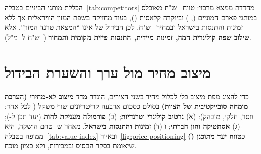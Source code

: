 הכללת מותגי הביניים בטבלה~\ref{tab:competitors} מחדדת ממצא מרכזי: טווח
~ש"ח מאוכלס במותגי פארם המוניים (, ) וביוקרה
קלאסית (), בעוד  מחזיקה בשפת המזון הוויראלית אך ללא
זמינות והתנסות בישראל ובמחיר ~ש"ח. לכן הבידול של  אינו
``המצאת טרנד המזון'', אלא \textbf{שילוב שפה קולינרית חמה, זמינות מיידית, התנסות
פיזית מקומית ותמחור } (~ש"ח ל- מ"ל).

\section{מיצוב מחיר מול ערך והשערת הבידול}
\label{sec:market-positioning}

כדי להציג מפת מיצוב בלי לכלול מחיר בשני הצירים, הוגדר \textbf{מדד מיצוב לא-מחירי
(הערכת מומחה סובייקטיבית של הצוות)} בסולם  כסכום ארבעה קריטריונים
שווי-משקל ( לכל אחד:  חסר,  חלקי,  מובהק):
(א) \textbf{נרטיב קולינרי וטרנדיות}; (ב) \textbf{פורמולה מעניקת לחות} (יעד תכן
ל-); (ג) \textbf{אסתטיקה והון חברתי}; ו-(ד) \textbf{זמינות והתנסות
בישראל}. מאחר ש- טרם הושקה, היא ממופה בטבלה~\ref{tab:value-index}
ובאיור~\ref{fig:price-positioning} כ\textbf{טווח יעד מתוכנן ()}
שיאומת בסקר הבסיס ובמכירות, ולא כציון מוכח.

